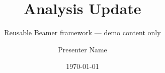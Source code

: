 \title[Analysis Update]{Analysis Update}
\subtitle{Reusable Beamer framework --- demo content only}
\author{Presenter Name}
\date{\today}
